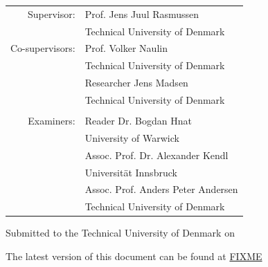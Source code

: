 \begin{titlepage}
\begin{center}
        \large
        {\def\arraystretch{1}\tabcolsep=10pt
        \begin{tabular}{rl}
        Supervisor:     & Prof. Jens Juul Rasmussen          \\ & Technical University of Denmark\\
        Co-supervisors: & Prof. Volker Naulin                \\ & Technical University of Denmark\\
                        & Researcher Jens Madsen             \\ & Technical University of Denmark\\
        &\\
        Examiners:      & Reader Dr.  Bogdan Hnat            \\ & University of Warwick\\
                        & Assoc. Prof. Dr.  Alexander Kendl  \\ & Universit{\"a}t Innsbruck\\
                        & Assoc. Prof. Anders Peter Andersen \\ & Technical University of Denmark\\
        \end{tabular}
        }

        \vfill

        Submitted to the Technical University of Denmark on \thesisDate

        \vfill
        The latest version of this document can be found at \href{FIXME}{FIXME}
    \end{center}
\end{titlepage}

